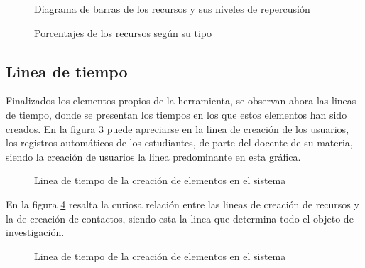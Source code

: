 \begin{figure}
\centering

\caption{Diagrama de barras de los recursos y sus niveles de repercusión}
\label{recursos_bars_1}
\end{figure}

\begin{figure}
\centering

\caption{Porcentajes de los recursos según su tipo}
\label{recursos_pie_1}
\end{figure}

\subsection{Linea de tiempo}
Finalizados los elementos propios de la herramienta, se observan ahora las
lineas de tiempo, donde se presentan los tiempos en los que estos elementos han
sido creados.
En la figura \ref{tiempos_area_1} puede apreciarse en la linea de creación de
los usuarios, los registros automáticos de los estudiantes, de parte del
docente de su materia, siendo la creación de usuarios la linea predominante en
esta gráfica.

\begin{figure}
\centering

\caption{Linea de tiempo de la creación de elementos en el sistema}
\label{tiempos_area_1}
\end{figure}

En la figura \ref{tiempos_area_2} resalta la curiosa relación entre las lineas
de creación de recursos y la de creación de contactos, siendo esta la linea que
determina todo el objeto de investigación.

\begin{figure}
\centering

\caption{Linea de tiempo de la creación de elementos en el sistema}
\label{tiempos_area_2}
\end{figure}


